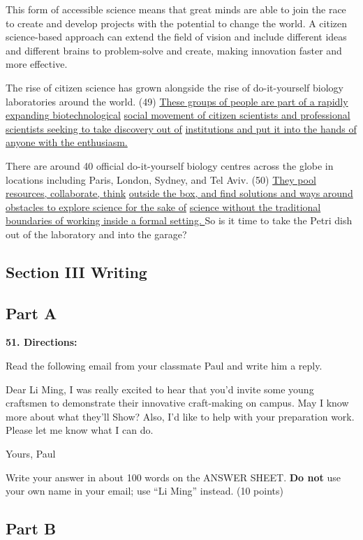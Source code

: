 \documentclass[UTF8,11pt]{ctexart}
\begin{document}
This form of accessible science means that great minds are able to join the race to create and develop projects with the potential to change the world. A citizen science-based approach can extend the field of vision and include different ideas and different brains to problem-solve and create, making innovation faster and more effective.


The rise of citizen science has grown alongside the rise of do-it-yourself biology laboratories around the world. (49) \uline{These groups of people are part of a rapidly expanding biotechnological} \uline{social movement of citizen scientists and professional scientists seeking to take discovery out of} \uline{institutions and put it into the hands of anyone with the enthusiasm.}


There are around 40 official do-it-yourself biology centres across the globe in locations including Paris, London, Sydney, and Tel Aviv. (50) \uline{They pool resources, collaborate, think} \uline{outside the box, and find solutions and ways around obstacles to explore science for the sake of} \uline{science without the traditional boundaries of working inside a formal setting. }So is it time to take the Petri dish out of the laboratory and into the garage?


\subsection*{\textbf{Section III Writing}}


\subsection*{\textbf{Part A}}


\textbf{51. Directions:}


Read the following email from your classmate Paul and write him a reply.


Dear Li Ming, I was really excited to hear that you’d invite some young craftsmen to demonstrate their innovative craft-making on campus. May I know more about what they’ll Show? Also, I’d like to help with your preparation work. Please let me know what I can do.


Yours, Paul


Write your answer in about 100 words on the ANSWER SHEET. \textbf{Do not} use your own name in your email; use “Li Ming” instead. (10 points)


\subsection*{\textbf{Part B}}
\end{document}
